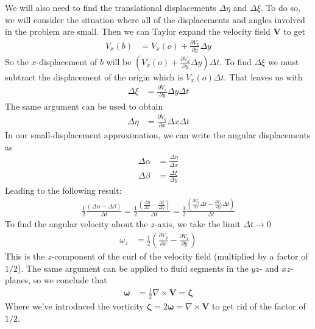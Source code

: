 \documentclass[a4paper, 12pt]{article}
\numberwithin{equation}{subsubsection}
\begin{document}
We will also need to find the translational displacements $\Delta \eta$ and $\Delta \xi$. To do so, we will consider the situation where all of the displacements and angles involved in the problem are small. Then we can Taylor expand the velocity field $\mathbf{V}$ to get
\begin{align}
	V_x(b) &= V_x(o) + \frac{\partial V_x}{\partial y} \Delta y
\end{align}
So the $x$-displacement of $b$ will be $\left(V_x(o) + \frac{\partial V_x}{\partial y} \Delta y\right) \Delta t$. To find $\Delta \xi$ we must subtract the displacement of the origin which is $V_x(o) \Delta t$. That leaves us with
\begin{align}
	\Delta \xi &= \frac{\partial V_x}{\partial y} \Delta y \Delta t
\end{align}
The same argument can be used to obtain
\begin{align}
	\Delta \eta &= \frac{\partial V_y}{\partial x} \Delta x \Delta t
\end{align}
In our small-displacement approximation, we can write the angular displacements as
\begin{align}
	\Delta \alpha &= \frac{\Delta \eta}{\Delta x} \\
	\Delta \beta &= \frac{\Delta \xi}{\Delta y}
\end{align}
Leading to the following result:
\begin{align}
	\frac{1}{2} \frac{(\Delta \alpha - \Delta \beta)}{\Delta t}   = \frac{1}{2} \frac{\left(\frac{\Delta \eta}{\Delta x} - \frac{\Delta \xi}{\Delta y}\right)}{\Delta t} = \frac{1}{2} \frac{\left(\frac{\partial V_y}{\partial x} \Delta t - \frac{\partial V_x}{\partial y} \Delta t\right)}{\Delta t}
\end{align}
To find the angular velocity about the $z$-axis, we take the limit $\Delta t \rightarrow 0$
\begin{align}
	\omega_z &= \frac{1}{2} \left(\frac{\partial V_y}{\partial x} - \frac{\partial V_x}{\partial y}\right)
\end{align}
This is the $z$-component of the curl of the velocity field (multiplied by a factor of $1/2$). The same argument can be applied to fluid segments in the $yz$- and $xz$-planes, so we conclude that
\begin{align}
	\mathbf{\omega} &= \frac{1}{2} \nabla \times \mathbf{V} = \mathbf{\zeta}
\end{align}
Where we've introduced the vorticity $\mathbf{\zeta} = 2 \mathbf{\omega} = \nabla \times \mathbf{V}$ to get rid of the factor of $1/2$.
\end{document}
